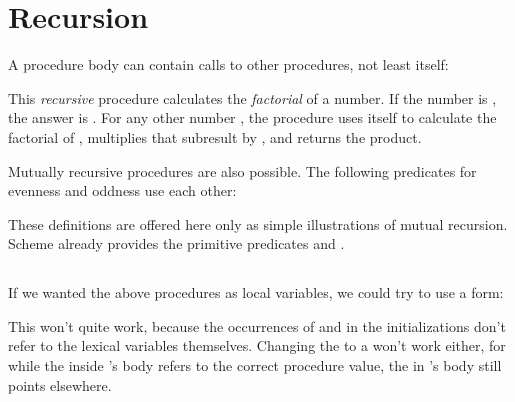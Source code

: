 \chapter{Recursion}

A procedure body can contain calls to other procedures,
not least itself:


\n This {\em recursive} procedure calculates the {\em
factorial} of a number.  If the number is , the
answer is .  For any other number , the
procedure uses itself to calculate the factorial of
, multiplies that subresult by , and
returns the product.

Mutually recursive procedures are also possible.  The
following predicates for evenness and oddness use each
other:



These definitions are offered here only as simple
illustrations of mutual recursion.  Scheme already
provides the primitive predicates  and
.


\section{}

If we wanted the above procedures as local
variables, we could try to use a  form:


\n This won't quite work, because the occurrences of
 and  in the initializations
don't refer to the lexical variables themselves.
Changing the  to a  won't work either,
for while the  inside 's body
refers to the correct procedure value, the 
in 's body still points elsewhere.

